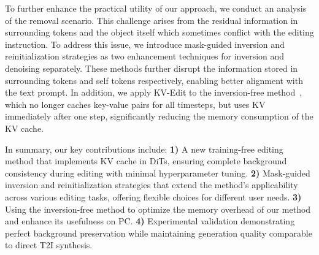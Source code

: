 To further enhance the practical utility of our approach, we conduct an analysis of the removal scenario. This challenge arises from the residual information in surrounding tokens and the object itself which sometimes conflict with the editing instruction. To address this issue, we introduce mask-guided inversion and reinitialization strategies as two enhancement techniques for inversion and denoising separately. These methods further disrupt the information stored in surrounding tokens and self tokens respectively, enabling better alignment with the text prompt. In addition, we apply KV-Edit to the inversion-free method~\cite{xu2024inversion,kulikov2024flowedit}, which no longer caches key-value pairs for all timesteps, but uses KV immediately after one step, significantly reducing the memory consumption of the KV cache.

In summary, our key contributions include:
\textbf{1)} A new training-free editing method that implements KV cache in DiTs, ensuring complete background consistency during editing with minimal hyperparameter tuning.
\textbf{2)} Mask-guided inversion and reinitialization strategies that extend the method's applicability across various editing tasks, offering flexible choices for different user needs.
\textbf{3)} Using the inversion-free method to optimize the memory overhead of our method and enhance its usefulness on PC.
\textbf{4)} Experimental validation demonstrating perfect background preservation while maintaining generation quality comparable to direct T2I synthesis.
